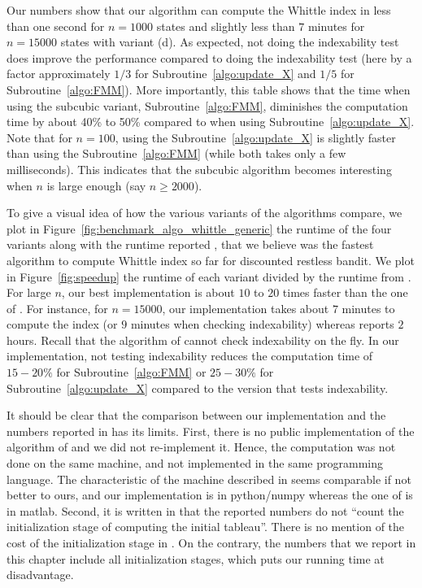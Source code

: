 Our numbers show that our algorithm can compute the Whittle index in less than one second for $n=1000$ states and slightly less than $7$ minutes for $n=15000$ states with variant (d). As expected, not doing the indexability test does improve the performance compared to doing the indexability test (here by a factor approximately $1/3$ for Subroutine~\ref{algo:update_X} and $1/5$ for Subroutine~\ref{algo:FMM}). More importantly, this table shows that the time when using the subcubic variant, Subroutine~\ref{algo:FMM}, diminishes the computation time by about 40\% to 50\% compared to when using Subroutine~\ref{algo:update_X}. Note that for $n=100$, using the Subroutine~\ref{algo:update_X} is slightly faster than using the Subroutine~\ref{algo:FMM} (while both takes only a few milliseconds). This indicates that the subcubic algorithm becomes interesting when $n$ is large enough (say $n\ge2000$).

To give a visual idea of how the various variants of the algorithms compare, we plot in Figure~\ref{fig:benchmark_algo_whittle_generic} the runtime of the four variants along with the runtime reported \cite{nino2020fast}, that we believe was the fastest algorithm to compute Whittle index so far for discounted restless bandit. We plot in Figure~\ref{fig:speedup} the runtime of each variant divided by the runtime from \cite{nino2020fast}. For large $n$, our best implementation is about $10$ to $20$ times faster than the one of \cite{nino2020fast}. For instance, for $n=15000$, our implementation takes about $7$ minutes to compute the index (or $9$ minutes when checking indexability) whereas \cite{nino2020fast} reports $2$ hours. Recall that the algorithm of \cite{nino2020fast} cannot check indexability on the fly. In our implementation, not testing indexability reduces the computation time of $15-20\%$ for Subroutine~\ref{algo:FMM} or $25-30\%$ for Subroutine~\ref{algo:update_X} compared to the version that tests indexability.

It should be clear that the comparison between our implementation and the numbers reported in \cite{nino2020fast} has its limits. First, there is no public implementation of the algorithm of \cite{nino2020fast} and we did not re-implement it. Hence, the computation was not done on the same machine, and not implemented in the same programming language. The characteristic of the machine described in \cite{nino2020fast} seems comparable if not better to ours, and our implementation is in python/numpy whereas the one of \cite{nino2020fast} is in matlab.  Second, it is written in \cite{nino2020fast} that the reported numbers do not ``count the initialization stage of computing the initial tableau''. There is no mention of the cost of the initialization stage in \cite{nino2020fast}. On the contrary, the numbers that we report in this chapter include all initialization stages, which puts our running time at disadvantage. 

